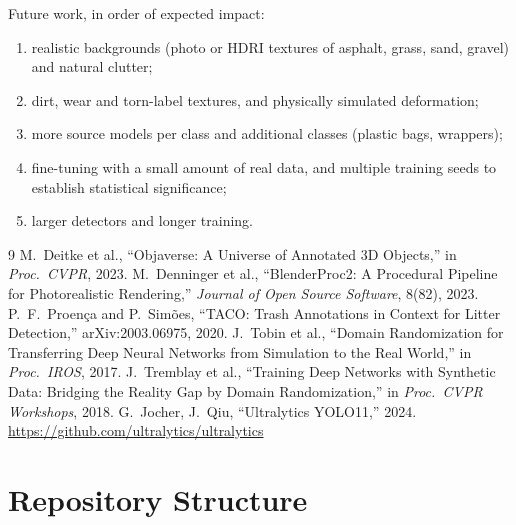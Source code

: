 \documentclass[11pt,a4paper]{article}
\begin{document}
Future work, in order of expected impact:
\begin{enumerate}
  \item realistic backgrounds (photo or HDRI textures of asphalt, grass, sand, gravel) and
        natural clutter;
  \item dirt, wear and torn-label textures, and physically simulated deformation;
  \item more source models per class and additional classes (plastic bags, wrappers);
  \item fine-tuning with a small amount of real data, and multiple training seeds to establish
        statistical significance;
  \item larger detectors and longer training.
\end{enumerate}

\begin{thebibliography}{9}
 M.~Deitke et al., ``Objaverse: A Universe of Annotated 3D Objects,'' in
  \emph{Proc.\ CVPR}, 2023.
 M.~Denninger et al., ``BlenderProc2: A Procedural Pipeline for
  Photorealistic Rendering,'' \emph{Journal of Open Source Software}, 8(82), 2023.
 P.~F.~Proen\c{c}a and P.~Sim\~{o}es, ``TACO: Trash Annotations in Context for
  Litter Detection,'' arXiv:2003.06975, 2020.
 J.~Tobin et al., ``Domain Randomization for Transferring Deep Neural Networks
  from Simulation to the Real World,'' in \emph{Proc.\ IROS}, 2017.
 J.~Tremblay et al., ``Training Deep Networks with Synthetic Data: Bridging the
  Reality Gap by Domain Randomization,'' in \emph{Proc.\ CVPR Workshops}, 2018.
 G.~Jocher, J.~Qiu, ``Ultralytics YOLO11,'' 2024.
  \url{https://github.com/ultralytics/ultralytics}
\end{thebibliography}

\appendix
\section{Repository Structure}
\end{document}
